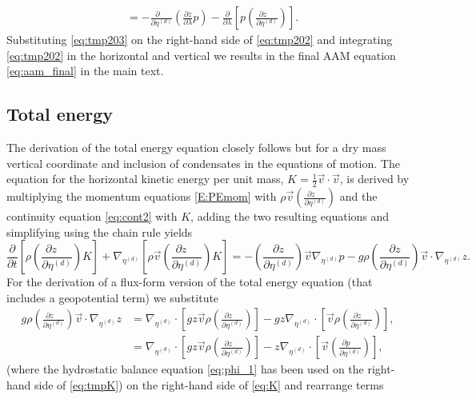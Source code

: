 \documentclass{agujournal}
\begin{document}
{\begin{align}
&=-\frac{\partial \quad}{\partial \eta^{(d)}}\left( \frac{\partial z}{\partial \lambda}p\right)-\frac{\partial }{\partial \lambda}\left[ p\left( \frac{\partial z\quad }{\partial \eta^{(d)}}\right)\right].\label{eq:tmp203}
\end{align}
Substituting \eqref{eq:tmp203} on the right-hand side of \eqref{eq:tmp202} and integrating \eqref{eq:tmp202} in the horizontal and vertical we results in the final AAM equation \eqref{eq:aam_final} in the main text.
\subsection{Total energy}
The derivation of the total energy equation closely follows \citet{K1974MWR} but for a dry mass vertical coordinate and inclusion of condensates in the equations of motion. The equation for the horizontal kinetic energy per unit mass, $K=\frac{1}{2}\vec{v}\cdot \vec{v}$, is derived by multiplying the momentum equations \eqref{E:PEmom} with $\rho \vec{v} \left( \frac{\partial z\quad }{\partial \eta^{(d)}}\right)$ and the continuity equation \eqref{eq:cont2} with $K$, adding the two resulting equations and simplifying using the chain rule yields
\begin{equation}
\frac{\partial }{\partial t}\left[ \rho \left( \frac{\partial z\quad }{\partial \eta^{(d)}}\right)K\right]+\nabla_{\eta^{(d)}} \left[ \rho \vec{v} \left( \frac{\partial z\quad }{\partial \eta^{(d)}}\right)K\right]=-\left( \frac{\partial z}{\partial \eta^{(d)}}\right)\vec{v} \nabla_{\eta^{(d)}}p-g\rho \left( \frac{\partial z}{\partial \eta^{(d)}}\right)\vec{v} \cdot \nabla_{\eta^{(d)}}z.\label{eq:K}
\end{equation}
For the derivation of a flux-form version of the total energy equation (that includes a geopotential term) we substitute
\begin{align}
g \rho \left( \frac{\partial z\quad }{\partial \eta^{(d)}}\right) \vec{v} \cdot \nabla_{\eta^{(d)}} z &= \nabla_{\eta^{(d)}}\cdot \left[ gz\vec{v}\rho  \left( \frac{\partial z\quad }{\partial \eta^{(d)}}\right) \right] - gz \nabla_{\eta^{(d)}} \cdot \left[ \vec{v}\rho  \left( \frac{\partial z\quad }{\partial \eta^{(d)}}\right) \right],\\
&=\nabla_{\eta^{(d)}}\cdot \left[ g z\vec{v}\rho  \left( \frac{\partial z\quad }{\partial \eta^{(d)}}\right) \right] -z \nabla_{\eta^{(d)}}\cdot \left[ \vec{v} \left( \frac{\partial p\quad }{\partial \eta^{(d)}}\right)\right],\label{eq:tmpK}
\end{align}
(where the hydrostatic balance equation \eqref{eq:phi_1} has been used on the right-hand side of \eqref{eq:tmpK}) on the right-hand side of \eqref{eq:K} and rearrange terms
}
\end{document}
